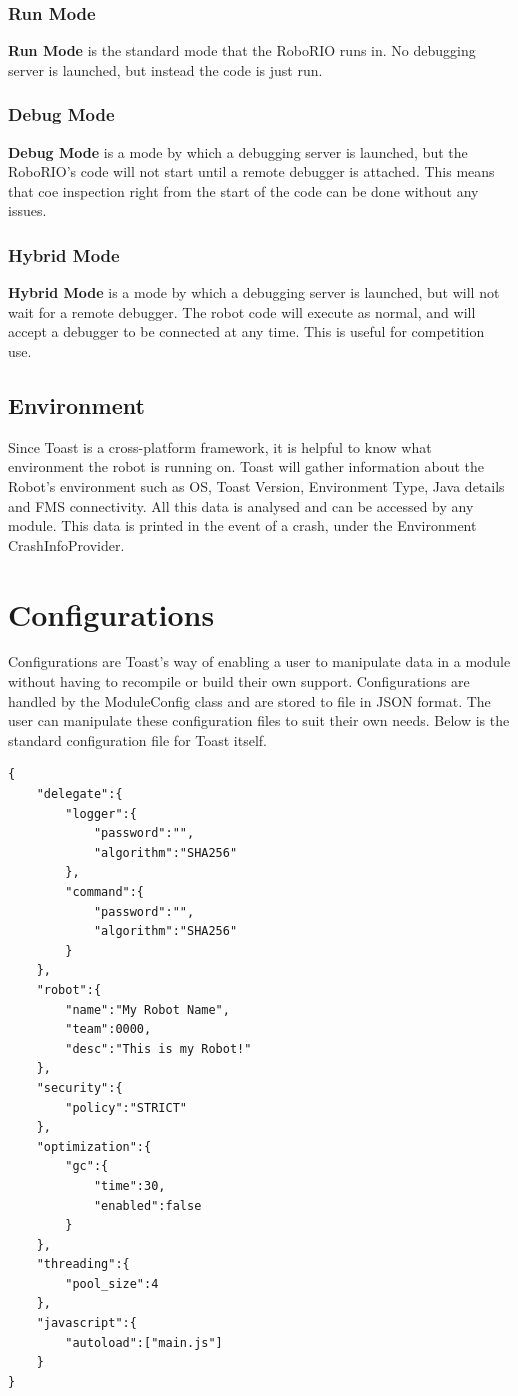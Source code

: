 \documentclass[a4paper,12pt]{article}
\begin{document}
\subsubsection{Run Mode}
\textbf{Run Mode} is the standard mode that the RoboRIO runs in. No debugging server is launched, but instead the code is just run.

\subsubsection{Debug Mode}
\textbf{Debug Mode} is a mode by which a debugging server is launched, but the RoboRIO's code will not start until a remote debugger is attached. This means that coe inspection right from the start of the code can be done without any issues.

\subsubsection{Hybrid Mode}
\textbf{Hybrid Mode} is a mode by which a debugging server is launched, but will not wait for a remote debugger. The robot code will execute as normal, and will accept a debugger to be connected at any time. This is useful for competition use.

\subsection{Environment}
Since Toast is a cross-platform framework, it is helpful to know what environment the robot is running on. Toast will gather information about the Robot's environment such as OS, Toast Version, Environment Type, Java details and FMS connectivity. All this data is analysed and can be accessed by any module. This data is printed in the event of a crash, under the Environment CrashInfoProvider.

\newpage

\section{Configurations}
Configurations are Toast's way of enabling a user to manipulate data in a module without having to recompile or build their own support. Configurations are handled by the ModuleConfig class and are stored to file in JSON format. The user can manipulate these configuration files to suit their own needs. Below is the standard configuration file for Toast itself.

\begin{lstlisting}
{
	"delegate":{
		"logger":{
			"password":"",
			"algorithm":"SHA256"
		},
		"command":{
			"password":"",
			"algorithm":"SHA256"
		}
	},
	"robot":{
		"name":"My Robot Name",
		"team":0000,
		"desc":"This is my Robot!"
	},
	"security":{
		"policy":"STRICT"
	},
	"optimization":{
		"gc":{
			"time":30,
			"enabled":false
		}
	},
	"threading":{
		"pool_size":4
	},
	"javascript":{
		"autoload":["main.js"]
	}
}

\end{lstlisting}
\end{document}
